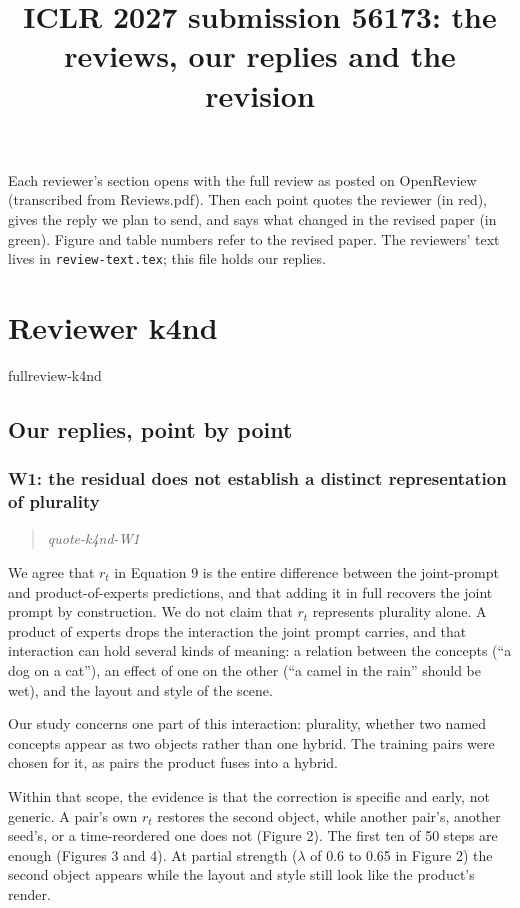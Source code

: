 \documentclass[11pt]{article}
\title{ICLR 2027 submission 56173: the reviews, our replies and the revision}
\date{}
\def\showfullreviews{}   %
\def\showquotes{}        %
\newcommand{\fullreview}[1]{\ifdefined\showfullreviews\csname fullreview-#1\endcsname\fi}
\newcommand{\reviewquote}[2]{\ifdefined\showquotes\begin{quote}\color{rev}\itshape\csname quote-#1-#2\endcsname\end{quote}\fi}
\begin{document}
\maketitle
Each reviewer's section opens with the full review as posted on OpenReview (transcribed from Reviews.pdf). Then each point quotes the reviewer (in red), gives the reply we plan to send, and says what changed in the revised paper (in green). Figure and table numbers refer to the revised paper. The reviewers' text lives in \texttt{review-text.tex}; this file holds our replies.

\section*{Reviewer k4nd}
\fullreview{k4nd}

\subsection*{Our replies, point by point}

\subsubsection*{W1: the residual does not establish a distinct representation of plurality}
\reviewquote{k4nd}{W1}

We agree that $r_t$ in Equation 9 is the entire difference between the joint-prompt and product-of-experts predictions, and that adding it in full recovers the joint prompt by construction. We do not claim that $r_t$ represents plurality alone. A product of experts drops the interaction the joint prompt carries, and that interaction can hold several kinds of meaning: a relation between the concepts (``a dog on a cat''), an effect of one on the other (``a camel in the rain'' should be wet), and the layout and style of the scene.

Our study concerns one part of this interaction: plurality, whether two named concepts appear as two objects rather than one hybrid. The training pairs were chosen for it, as pairs the product fuses into a hybrid.

Within that scope, the evidence is that the correction is specific and early, not generic. A pair's own $r_t$ restores the second object, while another pair's, another seed's, or a time-reordered one does not (Figure 2). The first ten of 50 steps are enough (Figures 3 and 4). At partial strength ($\lambda$ of 0.6 to 0.65 in Figure 2) the second object appears while the layout and style still look like the product's render.
\end{document}
